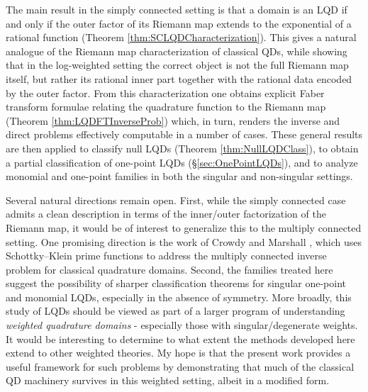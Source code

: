 \documentclass{article}
\numberwithin{equation}{section}
\begin{document}
The main result in the simply connected setting is that a domain is an LQD if and only if the outer factor of its Riemann map extends to the exponential of a rational function (Theorem \ref{thm:SCLQDCharacterization}). This gives a natural analogue of the Riemann map characterization of classical QDs, while showing that in the log-weighted setting the correct object is not the full Riemann map itself, but rather its rational inner part together with the rational data encoded by the outer factor. From this characterization one obtains explicit Faber transform formulae relating the quadrature function to the Riemann map (Theorem \ref{thm:LQDFTInverseProb}) which, in turn, renders the inverse and direct problems effectively computable in a number of cases. These general results are then applied to classify null LQDs (Theorem \ref{thm:NullLQDClass}), to obtain a partial classification of one-point LQDs (\S\ref{sec:OnePointLQDs}), and to analyze monomial and one-point families in both the singular and non-singular settings.

Several natural directions remain open. First, while the simply connected case admits a clean description in terms of the inner/outer factorization of the Riemann map, it would be of interest to generalize this to the multiply connected setting. One promising direction is the work of Crowdy and Marshall \cite{CrowdyMultipleQDs2004}, which uses Schottky–Klein prime functions to address the multiply connected inverse problem for classical quadrature domains. Second, the families treated here suggest the possibility of sharper classification theorems for singular one-point and monomial LQDs, especially in the absence of symmetry. More broadly, this study of LQDs should be viewed as part of a larger program of understanding \emph{weighted quadrature domains} - especially those with singular/degenerate weights. It would be interesting to determine to what extent the methods developed here extend to other weighted theories. My hope is that the present work provides a useful framework for such problems by demonstrating that much of the classical QD machinery survives in this weighted setting, albeit in a modified form.
\end{document}
